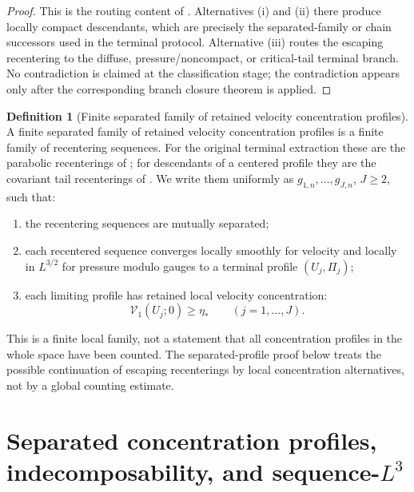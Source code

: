 \documentclass[11pt]{amsart}
\numberwithin{equation}{section}
\theoremstyle{plain}
\theoremstyle{definition}
\newtheorem{definition}[definition]{Definition}
\theoremstyle{remark}
\newcommand{\Vel}{\mathcal V}
\begin{document}
\begin{proof}
This is the routing content of
.  Alternatives \textup{(i)} and
\textup{(ii)} there produce locally compact descendants, which are precisely the
separated-family or chain successors used in the terminal protocol.  Alternative
\textup{(iii)} routes the escaping recentering to the diffuse,
pressure/noncompact, or critical-tail terminal branch.  No contradiction is
claimed at the classification stage; the contradiction appears only after the
corresponding branch closure theorem is applied.
\end{proof}

\begin{definition}[Finite separated family of retained velocity concentration profiles]
\label{def:finite-separated-profile-family}
A finite separated family of retained velocity concentration profiles is a finite
family of recentering sequences.  For the original terminal extraction these
are the parabolic recenterings of ; for
descendants of a centered profile they are the covariant tail recenterings of
.  We write them uniformly as
\(g_{1,n},\dots,g_{J,n}\), \(J\ge2\), such that:
\begin{enumerate}[label=(\roman*)]
   \item the recentering sequences are mutually separated;
   \item each recentered sequence converges locally smoothly for velocity and
   locally in \(L^{3/2}\) for pressure modulo gauges to a terminal profile
   \((U_j,\Pi_j)\);
   \item each limiting profile has retained local velocity concentration:
\[
   \Vel_1(U_j;0)\ge\eta_*
   \qquad (j=1,\dots,J).
\]
\end{enumerate}
This is a finite local family, not a statement that all concentration profiles
in the whole space have been counted.  The separated-profile proof below treats
the possible continuation of escaping recenterings by local concentration
alternatives, not by a global counting estimate.
\end{definition}

\section{Separated concentration profiles, indecomposability, and sequence-\texorpdfstring{\(L^3\)}{L3}}
\label{sec:separated-profiles-atomic}
\end{document}
